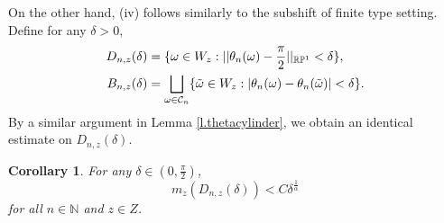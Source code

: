 \documentclass{amsart}
\newtheorem{corollary}{Corollary}
\newcommand{\NN}{\mathbb{N}}
\newcommand{\PP}{\mathbb{P}}
\newcommand{\RR}{\mathbb{R}}
\newcommand{\C}{\mathcal{C}}
\begin{document}
On the other hand, (iv) follows similarly to the subshift of finite type setting. Define for any $\delta>0$,
\begin{align*}
    D_{n,z}(\delta) &= \{\omega\in W_z: ||\theta_n(\omega) - \frac{\pi}{2}||_{\RR\PP^1} < \delta\},\\
    B_{n,z}(\delta)&= \bigsqcup_{\omega\in \C_n} \{\Tilde{\omega}\in W_z: |\theta_n(\omega) - \theta_n(\Tilde{\omega})| < \delta\}.
\end{align*}
By a similar argument in Lemma \ref{l.thetacylinder}, we obtain an identical estimate on $D_{n,z}(\delta)$.

\begin{corollary}\label{c.measureDNdoubling}
    For any $\delta \in(0,\frac{\pi}{2})$,  
    \[m_z(D_{n,z}(\delta))<C\delta^{\frac{1}{\alpha}}\]
    for all $n\in \NN$ and $z\in Z$.
\end{corollary}
\end{document}
